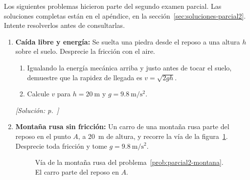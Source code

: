 \documentclass[11pt,a4paper]{book}
\begin{document}
Los siguientes problemas hicieron parte del segundo examen parcial. Las
soluciones completas están en el apéndice, en la
sección~\ref{sec:soluciones-parcial2}. Intente resolverlos antes de
consultarlas.

\begin{enumerate}[label=\textbf{P\arabic*.}, ref=P\arabic*, leftmargin=*]

    \item\label{prob:parcial2-caida} \textbf{Caída libre y energía:}
    Se suelta una piedra desde el reposo a una altura $h$ sobre el suelo.
    Desprecie la fricción con el aire.
    \begin{enumerate}
        \item Igualando la energía mecánica arriba y justo antes de tocar el
        suelo, demuestre que la rapidez de llegada es $v = \sqrt{2gh}$.
        \item Calcule $v$ para $h = \SI{20}{\meter}$ y
        $g = \SI{9.8}{\meter\per\second\squared}$.
    \end{enumerate}
    \hfill\textit{[Solución: p.~\pageref{sol:parcial2-caida}]}

    \item\label{prob:parcial2-montana} \textbf{Montaña rusa sin fricción:}
    Un carro de una montaña rusa parte del reposo en el punto $A$, a
    \SI{20}{\meter} de altura, y recorre la vía de la
    figura~\ref{fig:parcial2-montana}. Desprecie toda fricción y tome
    $g = \SI{9.8}{\meter\per\second\squared}$.

    \begin{figure}[htbp]
        \centering
        \caption{Vía de la montaña rusa del problema~\ref{prob:parcial2-montana}.
        El carro parte del reposo en $A$.}
        \label{fig:parcial2-montana}
    \end{figure}


\end{enumerate}
\end{document}
